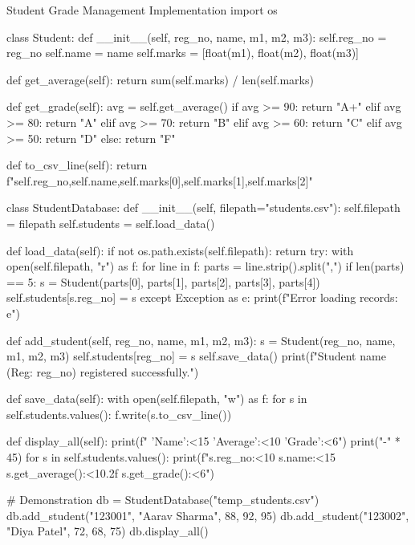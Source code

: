 \begin{pythoncode}{Student Grade Management Implementation}
import os

class Student:
    def __init__(self, reg_no, name, m1, m2, m3):
        self.reg_no = reg_no
        self.name = name
        self.marks = [float(m1), float(m2), float(m3)]
        
    def get_average(self):
        return sum(self.marks) / len(self.marks)
        
    def get_grade(self):
        avg = self.get_average()
        if avg >= 90: return "A+"
        elif avg >= 80: return "A"
        elif avg >= 70: return "B"
        elif avg >= 60: return "C"
        elif avg >= 50: return "D"
        else: return "F"
        
    def to_csv_line(self):
        return f"{self.reg_no},{self.name},{self.marks[0]},{self.marks[1]},{self.marks[2]}\n"

class StudentDatabase:
    def __init__(self, filepath="students.csv"):
        self.filepath = filepath
        self.students = {}
        self.load_data()
        
    def load_data(self):
        if not os.path.exists(self.filepath):
            return
        try:
            with open(self.filepath, "r") as f:
                for line in f:
                    parts = line.strip().split(",")
                    if len(parts) == 5:
                        s = Student(parts[0], parts[1], parts[2], parts[3], parts[4])
                        self.students[s.reg_no] = s
        except Exception as e:
            print(f"Error loading records: {e}")
            
    def add_student(self, reg_no, name, m1, m2, m3):
        s = Student(reg_no, name, m1, m2, m3)
        self.students[reg_no] = s
        self.save_data()
        print(f"Student {name} (Reg: {reg_no}) registered successfully.")
        
    def save_data(self):
        with open(self.filepath, "w") as f:
            for s in self.students.values():
                f.write(s.to_csv_line())
                
    def display_all(self):
        print(f" {'Name':<15} {'Average':<10} {'Grade':<6}")
        print("-" * 45)
        for s in self.students.values():
            print(f"{s.reg_no:<10} {s.name:<15} {s.get_average():<10.2f} {s.get_grade():<6}")

# Demonstration
db = StudentDatabase("temp_students.csv")
db.add_student("123001", "Aarav Sharma", 88, 92, 95)
db.add_student("123002", "Diya Patel", 72, 68, 75)
db.display_all()
\end{pythoncode}

